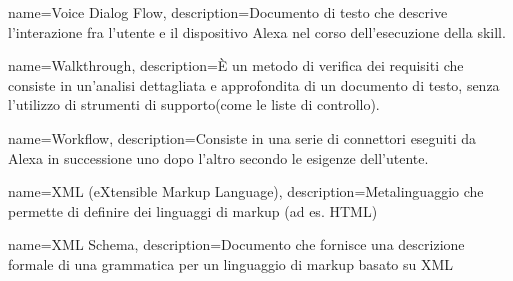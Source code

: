 {
name={Voice Dialog Flow},
description={Documento di testo che descrive l'interazione fra l'utente e il dispositivo Alexa nel corso dell'esecuzione della skill.}
}

{
name={Walkthrough},
description={È un metodo di verifica dei requisiti che consiste in un'analisi dettagliata e approfondita di un documento di testo, senza l'utilizzo di strumenti di supporto(come le liste di controllo).}
}

{
name={Workflow},
description={Consiste in una serie di connettori eseguiti da Alexa in successione uno dopo l'altro secondo le esigenze dell'utente. }
}

{
	name={XML (eXtensible Markup Language)},
	description={Metalinguaggio che permette di definire dei linguaggi di markup (ad es. HTML)}
}

{
	name={XML Schema},
	description={Documento che fornisce una descrizione formale di una grammatica per un linguaggio di markup basato su XML}
}